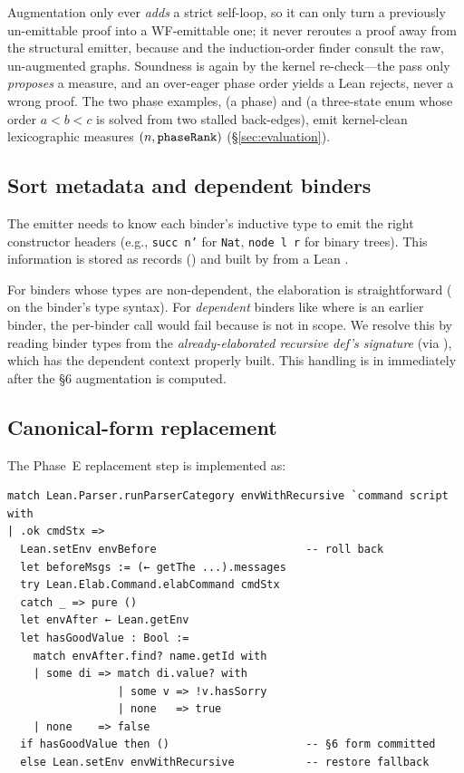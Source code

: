 Augmentation only ever \emph{adds} a strict self-loop, so it can only turn a
previously un-emittable proof into a WF-emittable one; it never reroutes a
proof away from the structural emitter, because  and the
induction-order finder consult the raw, un-augmented graphs. Soundness is again
by the kernel re-check---the pass only \emph{proposes} a measure, and an
over-eager phase order yields a  Lean rejects, never a wrong proof.
The two phase examples,  (a  phase) and
 (a three-state enum whose order \(a < b < c\) is solved from
two stalled back-edges), emit kernel-clean lexicographic measures
\((n, \texttt{phaseRank})\) (§\ref{sec:evaluation}).

\subsection{Sort metadata and dependent binders}

The emitter needs to know each binder's inductive type to emit the right
constructor headers (e.g., \texttt{succ n'} for \texttt{Nat}, \texttt{node l r}
for binary trees). This information is stored as  records
() and built by
 from a Lean .

For binders whose types are non-dependent, the elaboration is
straightforward ( on the binder's type
syntax). For \emph{dependent} binders like  where
 is an earlier binder, the per-binder  call would
fail because  is not in scope. We resolve this by reading
binder types from the \emph{already-elaborated recursive def's signature}
(via ), which has the dependent context
properly built. This handling is in  immediately after
the §6 augmentation is computed.

\subsection{Canonical-form replacement}

The Phase~E replacement step is implemented as:

\begin{lstlisting}
match Lean.Parser.runParserCategory envWithRecursive `command script with
| .ok cmdStx =>
  Lean.setEnv envBefore                       -- roll back
  let beforeMsgs := (← getThe ...).messages
  try Lean.Elab.Command.elabCommand cmdStx
  catch _ => pure ()
  let envAfter ← Lean.getEnv
  let hasGoodValue : Bool :=
    match envAfter.find? name.getId with
    | some di => match di.value? with
                 | some v => !v.hasSorry
                 | none   => true
    | none    => false
  if hasGoodValue then ()                     -- §6 form committed
  else Lean.setEnv envWithRecursive           -- restore fallback
\end{lstlisting}

